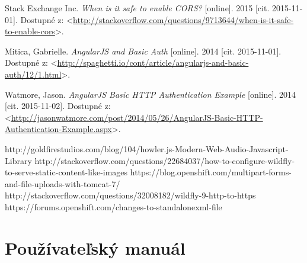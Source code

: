 \documentclass[12pt,oneside]{fithesis2}
\begin{document}
\begin{thebibliography}{59}
  		Stack Exchange Inc.
  		\emph{When is it safe to enable CORS?}
  		[online].
  		2015
  		[cit. 2015-11-01].
  		Dostupné z: <\url{http://stackoverflow.com/questions/9713644/when-is-it-safe-to-enable-cors}>.
  		
  		Mitica, Gabrielle.
  		\emph{AngularJS and Basic Auth}
  		[online].
  		2014
  		[cit. 2015-11-01].
  		Dostupné z: <\url{http://spaghetti.io/cont/article/angularjs-and-basic-auth/12/1.html}>.
  		
  		Watmore, Jason.
  		\emph{AngularJS Basic HTTP Authentication Example}
  		[online].
  		2014
  		[cit. 2015-11-02].
  		Dostupné z: <\url{http://jasonwatmore.com/post/2014/05/26/AngularJS-Basic-HTTP-Authentication-Example.aspx}>.
  		
  		http://goldfirestudios.com/blog/104/howler.js-Modern-Web-Audio-Javascript-Library
  		http://stackoverflow.com/questions/22684037/how-to-configure-wildfly-to-serve-static-content-like-images
  		https://blog.openshift.com/multipart-forms-and-file-uploads-with-tomcat-7/
  		http://stackoverflow.com/questions/32008182/wildfly-9-http-to-https
  		https://forums.openshift.com/changes-to-standalonexml-file
  		
  		  			
	\end{thebibliography} 
	
    \appendix
    \chapter{Používateľský manuál} 	  %
\end{document}
